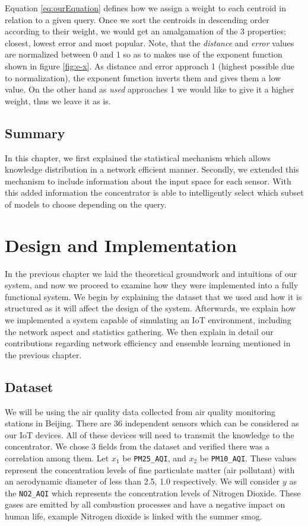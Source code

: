 \documentclass{mproj}
\begin{document}
Equation \ref{eq:ourEquation} defines how we assign a weight to each centroid in relation to a given query. Once we sort the centroids in descending order according to their weight, we would get an amalgamation of the 3 properties; closest, lowest error and most popular. Note, that the \textit{distance} and \textit{error} values are normalized between 0 and 1 so as to makes use of the exponent function shown in figure \ref{fig:e-x}. As distance and error approach 1 (highest possible due to normalization), the exponent function inverts them and gives them a low value. On the other hand as \textit{used} approaches 1 we would like to give it a higher weight, thus we leave it as is.

\section{Summary}
In this chapter, we first explained the statistical mechanism which allows knowledge distribution in a network efficient manner. Secondly, we extended this mechanism to include information about the input space for each sensor. With this added information the concentrator is able to intelligently select which subset of models to choose depending on the query.

\chapter{Design and Implementation}
In the previous chapter we laid the theoretical groundwork and intuitions of our system, and now we proceed to examine how they were implemented into a fully functional system. We begin by explaining the dataset that we used and how it is structured as it will affect the design of the system. Afterwards, we explain how we implemented a system capable of simulating an IoT environment, including the network aspect and statistics gathering. We then explain in detail our contributions regarding network efficiency and ensemble learning mentioned in the previous chapter.

\section{Dataset}
We will be using the air quality data \cite{air-quality-inference-meets-big-data} collected from air quality monitoring stations in Beijing. There are 36 independent sensors which can be considered as our IoT devices. All of these devices will need to transmit the knowledge to the concentrator. We chose 3 fields from the dataset and verified there was a correlation among them. Let $x_1$ be \texttt{PM25\_AQI}, and $x_2$ be \texttt{PM10\_AQI}. These values represent the concentration levels of fine particulate matter (air pollutant) with an aerodynamic diameter of less than 2.5, 1.0 respectively. We will consider $y$ as the \texttt{NO2\_AQI} which represents the concentration levels of Nitrogen Dioxide. These gases are emitted by all combustion processes and have a negative impact on human life, example Nitrogen dioxide is linked with the summer smog. \cite{Richter2005}
\end{document}
